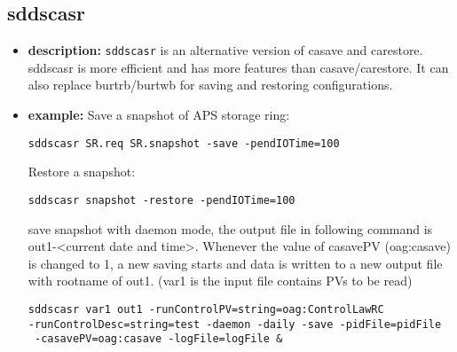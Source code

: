 %
%
\begin{latexonly}
\newpage
\end{latexonly}

%
%
\subsection{sddscasr}
\label{sddscasr}

\begin{itemize}
\item {\bf description:}
%
%
\verb+sddscasr+ is an alternative version of casave and carestore. sddscasr is
more efficient and has more features than casave/carestore. It can also replace 
burtrb/burtwb for saving and restoring configurations.

\item {\bf example:} 
%
% 
%
Save a snapshot of APS storage ring:
\begin{verbatim}
sddscasr SR.req SR.snapshot -save -pendIOTime=100
\end{verbatim}
Restore a snapshot:
\begin{verbatim}
sddscasr snapshot -restore -pendIOTime=100
\end{verbatim}
save snapshot with daemon mode, the output file in following command is out1-<current date and time>.
Whenever the value of casavePV (oag:casave) is changed to 1, a new saving starts and data is written
to a new output file with rootname of out1. (var1 is the input file contains PVs to be read)
\begin{verbatim}
sddscasr var1 out1 -runControlPV=string=oag:ControlLawRC 
-runControlDesc=string=test -daemon -daily -save -pidFile=pidFile
 -casavePV=oag:casave -logFile=logFile &
\end{verbatim}


\end{itemize}

